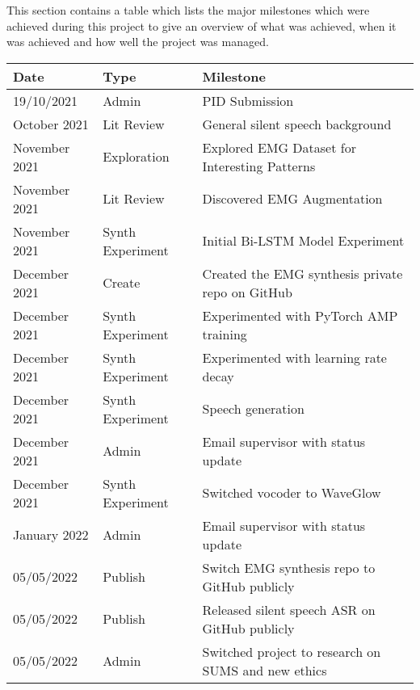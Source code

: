 This section contains a table which lists the major milestones which were
achieved during this project to give an overview of what was achieved, when it was
achieved and how well the project was managed.

{\small\begin{center}
    \begin{tabularx}{\textwidth}{ l l l }
        Date & Type & Milestone \\
        \hline
        19/10/2021 & Admin & PID Submission \\
        October 2021 & Lit Review & General silent speech background \\
        November 2021 & Exploration & Explored EMG Dataset for Interesting Patterns \\
        November 2021 & Lit Review & Discovered EMG Augmentation \\
        November 2021 & Synth Experiment & Initial Bi-LSTM Model Experiment \\
        December 2021 & Create & Created the EMG synthesis private repo on GitHub \\
        December 2021 & Synth Experiment & Experimented with PyTorch AMP training \\
        December 2021 & Synth Experiment & Experimented with learning rate decay \\
        December 2021 & Synth Experiment & Speech generation \\
        December 2021 & Admin & Email supervisor with status update \\
        December 2021 & Synth Experiment & Switched vocoder to WaveGlow \\
        January 2022 & Admin & Email supervisor with status update \\
        05/05/2022 & Publish & Switch EMG synthesis repo to GitHub publicly \\
        05/05/2022 & Publish & Released silent speech ASR on GitHub publicly \\
        05/05/2022 & Admin & Switched project to research on SUMS and new ethics
    \end{tabularx}
\end{center}}